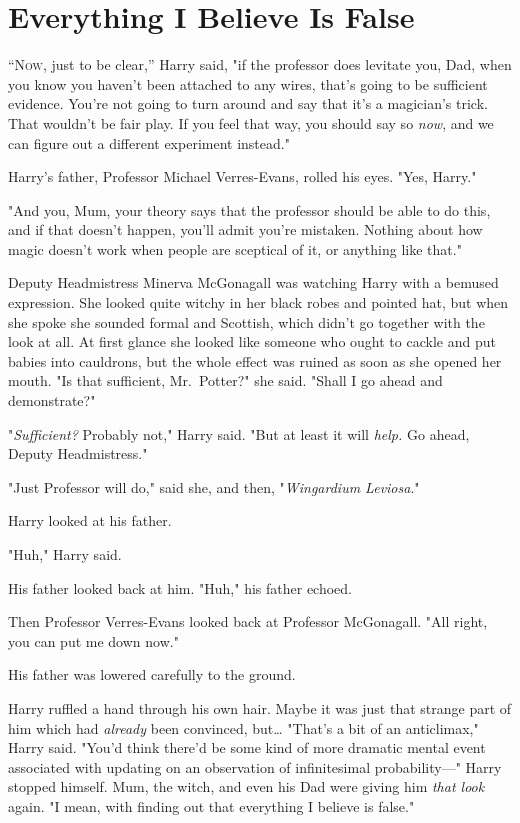 \chapter{Everything I Believe Is False}

\lettrine{“N}{ow}, just to be clear,'' Harry said, "if the professor does levitate you, Dad, 
when you know you haven't been attached to any wires, that's going to be 
sufficient evidence. You're not going to turn around and say that it's a 
magician's trick. That wouldn't be fair play. If you feel that way, you should 
say so \emph{now}, and we can figure out a different experiment instead."

Harry's father, Professor Michael Verres-Evans, rolled his eyes. "Yes, Harry."

"And you, Mum, your theory says that the professor should be able to do this, 
and if that doesn't happen, you'll admit you're mistaken. Nothing about how 
magic doesn't work when people are sceptical of it, or anything like that."

Deputy Headmistress Minerva McGonagall was watching Harry with a bemused 
expression. She looked quite witchy in her black robes and pointed hat, but 
when she spoke she sounded formal and Scottish, which didn't go together with 
the look at all. At first glance she looked like someone who ought to cackle 
and put babies into cauldrons, but the whole effect was ruined as soon as she 
opened her mouth. "Is that sufficient, Mr.~Potter?" she said. "Shall I go ahead 
and demonstrate?"

"\emph{Sufficient?} Probably not," Harry said. "But at least it will 
\emph{help.} Go ahead, Deputy Headmistress."

"Just Professor will do," said she, and then, "\emph{Wingardium Leviosa}."

Harry looked at his father.

"Huh," Harry said.

His father looked back at him. "Huh," his father echoed.

Then Professor Verres-Evans looked back at Professor McGonagall. "All right, 
you can put me down now."

His father was lowered carefully to the ground.

Harry ruffled a hand through his own hair. Maybe it was just that strange part 
of him which had \emph{already} been convinced, but{\ldots} "That's a bit of an 
anticlimax," Harry said. "You'd think there'd be some kind of more dramatic 
mental event associated with updating on an observation of infinitesimal 
probability---" Harry stopped himself. Mum, the witch, and even his Dad were 
giving him \emph{that look} again. "I mean, with finding out that everything I 
believe is false."

